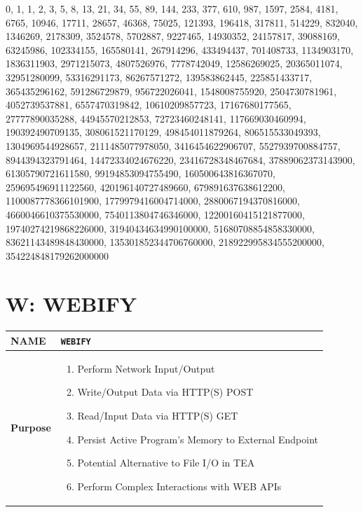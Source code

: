 \documentclass[a4paper, 18pt]{book} %
\begin{document}
{{{  \vspace{2em}
 \begin{tcbverbatim}[title=Sample OUTPUT 2 from TEA Fibonacci v1 for fib(100)]
0, 1, 1, 2, 3, 5, 8, 13, 21, 34, 55, 89, 144, 233, 377, 610, 987, 1597, 2584, 4181, 6765, 10946, 17711, 28657, 46368, 75025, 121393, 196418, 317811, 514229, 832040, 1346269, 2178309, 3524578, 5702887, 9227465, 14930352, 24157817, 39088169, 63245986, 102334155, 165580141, 267914296, 433494437, 701408733, 1134903170, 1836311903, 2971215073, 4807526976, 7778742049, 12586269025, 20365011074, 32951280099, 53316291173, 86267571272, 139583862445, 225851433717, 365435296162, 591286729879, 956722026041, 1548008755920, 2504730781961, 4052739537881, 6557470319842, 10610209857723, 17167680177565, 27777890035288, 44945570212853, 72723460248141, 117669030460994, 190392490709135, 308061521170129, 498454011879264, 806515533049393, 1304969544928657, 2111485077978050, 3416454622906707, 5527939700884757, 8944394323791464, 14472334024676220, 23416728348467684, 37889062373143900, 61305790721611580, 99194853094755490, 160500643816367070, 259695496911122560, 420196140727489660, 679891637638612200, 1100087778366101900, 1779979416004714000, 2880067194370816000, 4660046610375530000, 7540113804746346000, 12200160415121877000, 19740274219868226000, 31940434634990100000, 51680708854858330000, 83621143489848430000, 135301852344706760000, 218922995834555200000, 354224848179262000000
  \end{tcbverbatim}
 \vspace{2em}




 
 
\chapter{W: WEBIFY}
\label{CHAPW}


\begin{table}[H]
  \centering
  \LARGE
	\begin{tabular}[t]{|p{}|p{}}
 
	\textbf{NAME} & \texttt{WEBIFY}\\
	\hline
	\textbf{Purpose} & \begin{enumerate}
	\item Perform Network Input/Output
	\item Write/Output Data via HTTP(S) POST
	\item Read/Input Data via HTTP(S) GET
	\item Persist Active Program's Memory to External Endpoint
	\item Potential Alternative to File I/O in TEA
	\item Perform Complex Interactions with WEB APIs
	\end{enumerate}\\
	\hline
	              

\end{tabular}
\end{table}}}}
\end{document}
